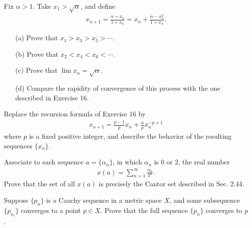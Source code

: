   \begin{exercise}[Rudin 3.17]
    Fix $\alpha > 1$. Take $x_1 > \sqrt{\alpha}$, and define
    \begin{align*}
      x_{n+1} = \frac{\alpha + x_n}{1 + x_n} = x_n + \frac{\alpha - x_n^2}{1 + x_n}.
    \end{align*}
    \begin{enumerate} 
      \item[(a)] Prove that $x_1 > x_3 > x_5 > \cdots$.
      \item[(b)] Prove that $x_2 < x_4 < x_6 < \cdots$.
      \item[(c)] Prove that $\lim x_n = \sqrt{\alpha}$.
      \item[(d)] Compare the rapidity of convergence of this process with the one described in Exercise 16.
    \end{enumerate}
  \end{exercise}
  \begin{solution}
    
  \end{solution}

  \begin{exercise}[Rudin 3.18]
    Replace the recursion formula of Exercise 16 by
    \begin{align*}
      x_{n+1} = \frac{p-1}{p}x_n + \frac{\alpha}{p}x_n^{-p+1}
    \end{align*}
    where $p$ is a fixed positive integer, and describe the behavior of the resulting sequences $\{x_n\}$.
  \end{exercise}
  \begin{solution}
    
  \end{solution}

  \begin{exercise}[Rudin 3.19]
    Associate to each sequence $a = \{\alpha_n\}$, in which $\alpha_n$ is 0 or 2, the real number
    \begin{align*}
      x(a) = \sum_{n=1}^{\infty} \frac{\alpha_n}{3^n}.
    \end{align*}
    Prove that the set of all $x(a)$ is precisely the Cantor set described in Sec. 2.44.
  \end{exercise}
  \begin{solution}
    
  \end{solution}

  \begin{exercise}[Rudin 3.20]
    Suppose $\{p_n\}$ is a Cauchy sequence in a metric space $X$, and some subsequence $\{p_{n_i}\}$ converges to a point $p \in X$. Prove that the full sequence $\{p_n\}$ converges to $p$.
  \end{exercise}
  \begin{solution}
    
  \end{solution}


